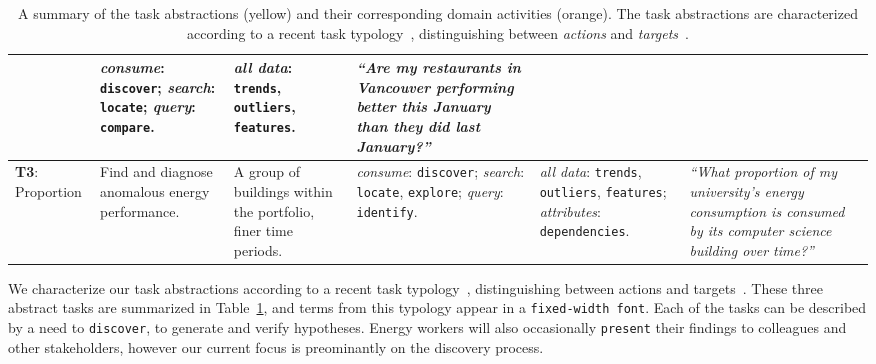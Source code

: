 \documentclass[journal]{vgtc}                %
\begin{document}
\begin{table}[ht]
\begin{center}
\begin{tabular}{p{}|>{\RaggedRight}p{}|>{\RaggedRight}p{}|>{\RaggedRight}p{}|>{\RaggedRight}p{}|>{\RaggedRight}p{}}
        & {\it consume}: {\tt discover}; {\it search}: {\tt locate}; {\it query}: {\tt compare}. 
        
        & {\it all data}: {\tt trends}, {\tt outliers}, {\tt features}.
        
        & {\it ``Are my restaurants in Vancouver performing better this January than they did last January?''}
        
        \\
        
        \hline
        
        \cellcolor{nmYellow} {\bf T3}: Proportion 
        
        & \cellcolor{nmOrange} Find and diagnose anomalous energy performance. 
        
        & A group of buildings within the portfolio, finer time periods. 
        
        & {\it consume}: {\tt discover}; {\it search}: {\tt locate}, {\tt explore}; {\it query}: {\tt identify}. 
        
        & {\it all data}: {\tt trends}, {\tt outliers}, {\tt features}; {\it attributes}: {\tt dependencies}. 
        
        & {\it ``What proportion of my university's energy consumption is consumed by its computer science building over time?''}
        
        \\
        
        \hline  
        
    \end{tabular}
    \vspace{-0.3cm}
    \caption{A summary of the task abstractions (yellow) and their corresponding domain activities (orange). The task abstractions are characterized according to a recent task typology~\cite{Brehmer2013}, distinguishing between \textsl{actions} and \textsl{targets}~\cite{Munzner2014}.}
    \label{tab:task-abstractions}
    \end{center}
    \vspace{-0.6cm}
\end{table}

We characterize our task abstractions according to a recent task typology~\cite{Brehmer2013}, distinguishing between actions and targets~\cite{Munzner2014}. 
These three abstract tasks are summarized in Table~\ref{tab:task-abstractions}, and terms from this typology appear in a {\tt fixed-width font}.
Each of the tasks can be described by a need to {\tt discover}, to generate and verify hypotheses.
Energy workers will also occasionally {\tt present} their findings to colleagues and other stakeholders, however our current focus is preominantly on the discovery process. 
\end{document}
